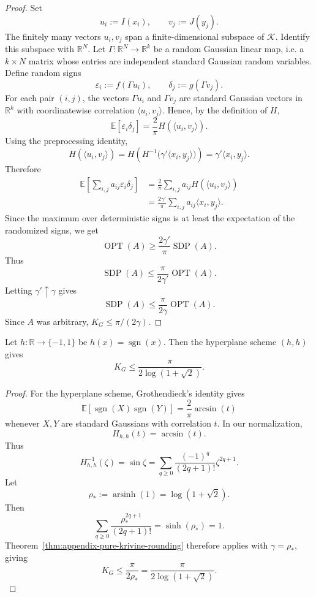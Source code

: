 \begin{proof}
Set
\[
    u_i:=I(x_i),
    \qquad
    v_j:=J(y_j).
\]
The finitely many vectors \(u_i,v_j\) span a finite-dimensional subspace of
\(\mathcal K\). Identify this subspace with \(\mathbb R^N\). Let
\(\Gamma:\mathbb R^N\to\mathbb R^k\) be a random Gaussian linear map, i.e.
a \(k\times N\) matrix whose entries are independent standard Gaussian
random variables. Define random signs
\[
    \varepsilon_i
    :=
    f\left(\Gamma u_i\right),
    \qquad
    \delta_j
    :=
    g\left(\Gamma v_j\right).
\]
For each pair \((i,j)\), the vectors \(\Gamma u_i\) and \(\Gamma v_j\) are
standard Gaussian vectors in \(\mathbb R^k\) with coordinatewise correlation
\(\langle u_i,v_j\rangle\). Hence, by the definition of \(H\),
\[
    \mathbb E[\varepsilon_i\delta_j]
    =
    \frac{2}{\pi}
    H(\langle u_i,v_j\rangle).
\]
Using the preprocessing identity,
\[
    H(\langle u_i,v_j\rangle)
    =
    H\left(H^{-1}\bigl(\gamma'\langle x_i,y_j\rangle\bigr)\right)
    =
    \gamma'\langle x_i,y_j\rangle.
\]
Therefore
\[
\begin{aligned}
    \mathbb E\left[\sum_{i,j} a_{ij}\varepsilon_i\delta_j\right]
    &=
    \frac{2}{\pi}\sum_{i,j}a_{ij}
        H(\langle u_i,v_j\rangle) \\
    &=
    \frac{2\gamma'}{\pi}
    \sum_{i,j}a_{ij}\langle x_i,y_j\rangle.
\end{aligned}
\]
Since the maximum over deterministic signs is at least the expectation of
the randomized signs, we get
\[
    \operatorname{OPT}(A)
    \ge
    \frac{2\gamma'}{\pi}\operatorname{SDP}(A).
\]
Thus
\[
    \operatorname{SDP}(A)
    \le
    \frac{\pi}{2\gamma'}\operatorname{OPT}(A).
\]
Letting \(\gamma'\uparrow\gamma\) gives
\[
    \operatorname{SDP}(A)
    \le
    \frac{\pi}{2\gamma}\operatorname{OPT}(A).
\]
Since \(A\) was arbitrary, \(K_G\le \pi/(2\gamma)\).
\end{proof}

\begin{corollary}
\label{cor:appendix-classical-krivine}
Let \(h:\mathbb R\to\{-1,1\}\) be \(h(x)=\operatorname{sgn}(x)\). Then the
hyperplane scheme \((h,h)\) gives
\[
    K_G\le \frac{\pi}{2\log(1+\sqrt 2)}.
\]
\end{corollary}

\begin{proof}
For the hyperplane scheme, Grothendieck's identity gives
\[
    \mathbb E[\operatorname{sgn}(X)\operatorname{sgn}(Y)]
    =
    \frac{2}{\pi}\arcsin(t)
\]
whenever \(X,Y\) are standard Gaussians with correlation \(t\). In our
normalization,
\[
    H_{h,h}(t)=\arcsin(t).
\]
Thus
\[
    H_{h,h}^{-1}(\zeta)=\sin \zeta
    =
    \sum_{q\ge 0}\frac{(-1)^q}{(2q+1)!}\zeta^{2q+1}.
\]
Let
\[
    \rho_*:=\operatorname{arsinh}(1)=\log(1+\sqrt 2).
\]
Then
\[
    \sum_{q\ge 0}
    \frac{\rho_*^{2q+1}}{(2q+1)!}
    =
    \sinh(\rho_*)
    =
    1.
\]
Theorem~\ref{thm:appendix-pure-krivine-rounding} therefore applies with
\(\gamma=\rho_*\), giving
\[
    K_G\le \frac{\pi}{2\rho_*}
    =
    \frac{\pi}{2\log(1+\sqrt 2)}.
\]
\end{proof}

